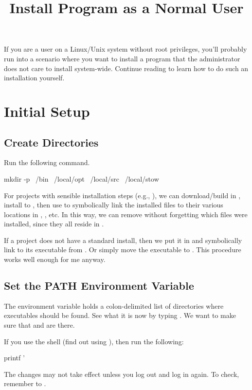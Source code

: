 
\title{Install Program as a Normal User}
\date{}



\tableofcontents

If you are a user on a Linux/Unix system without root privileges, you'll probably run into a scenario where you want to install a program that the administrator does not care to install system-wide.
Continue reading to learn how to do such an installation yourself.


\section{Initial Setup}

\subsection{Create Directories}

Run the following command.
\begin{code}
mkdir -p ~/bin ~/local/opt ~/local/src ~/local/stow
\end{code}
For projects with sensible installation steps (e.g., ), we can download/build in , install to , then use  to symbolically link the installed files to their various locations in , , etc.
In this way, we can remove  without forgetting which files were installed, since they all reside in .

If a project  does not have a standard install, then we put it in  and symbolically link to its executable from .
Or simply move the executable to .
This procedure works well enough for me anyway.

\subsection{Set the PATH Environment Variable}
\label{sec:PATH}

The  environment variable holds a colon-delimited list of directories where executables should be found.
See what it is now by typing .
We want to make sure that  and  are there.

If you use the  shell (find out using ), then run the following:
\begin{code}
printf '%
\end{code}
The changes may not take effect unless you log out and log in again.
To check, remember to .

